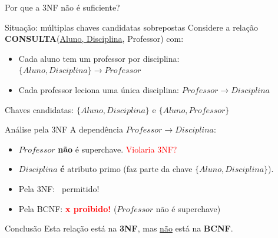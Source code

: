 \documentclass[9pt]{beamer}
\begin{document}
\begin{frame}{Por que a 3NF não é suficiente?}
\small
\begin{block}{Situação: múltiplas chaves candidatas sobrepostas}
Considere a relação \textbf{CONSULTA}(\underline{Aluno, Disciplina}, Professor) com:
\begin{itemize}
  \item Cada aluno tem um professor por disciplina: $\{Aluno, Disciplina\} \to Professor$
  \item Cada professor leciona uma única disciplina: $Professor \to Disciplina$
\end{itemize}
Chaves candidatas: $\{Aluno, Disciplina\}$ e $\{Aluno, Professor\}$
\end{block}

\vspace{0.2cm}

\begin{alertblock}{Análise pela 3NF}
A dependência $Professor \to Disciplina$:
\begin{itemize}
  \item $Professor$ \textbf{não} é superchave. \quad \textcolor{red}{\textsf{Violaria 3NF?}}
  \item $Disciplina$ \textbf{é} atributo primo (faz parte da chave $\{Aluno, Disciplina\}$).
  \item Pela 3NF: \textcolor{green!60!black}{\checkmark\ permitido!}
  \item Pela BCNF: \textcolor{red}{\textbf{x proibido!}} ($Professor$ não é superchave)
\end{itemize}
\end{alertblock}

\vspace{0.1cm}
\begin{exampleblock}{Conclusão}
Esta relação está na \textbf{3NF}, mas \underline{não} está na \textbf{BCNF}.
\end{exampleblock}
\end{frame}
\end{document}
